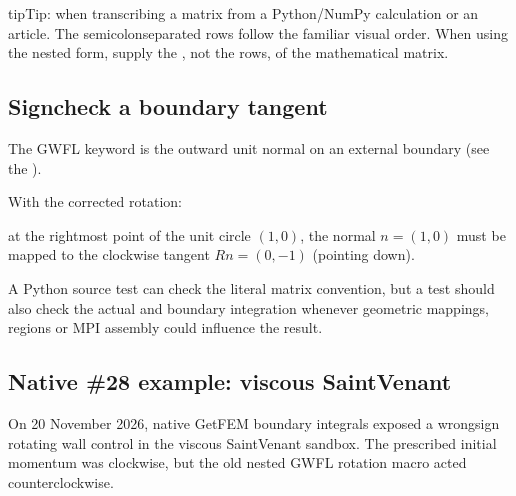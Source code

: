 \documentclass[letterpaper,10pt,english]{sphinxmanual}
\begin{document}
\begin{sphinxadmonition}{tip}{Tip:}
\sphinxAtStartPar
{} \sphinxcode{\sphinxupquote{{[}a,b;c,d{]}}} when transcribing
a matrix from a Python/NumPy calculation or an article.
The semicolon\sphinxhyphen{}separated rows follow the familiar visual order.
When using the nested form, supply the , not the rows,
of the mathematical matrix.
\end{sphinxadmonition}


\subsection{Sign\sphinxhyphen{}check a boundary tangent}
\label{\detokenize{getfem_gwfl:sign-check-a-boundary-tangent}}
\sphinxAtStartPar
The GWFL keyword  is the outward unit normal
on an external boundary (see the ).

\sphinxAtStartPar
With the corrected rotation:

\begin{sphinxVerbatim}[commandchars=\\\{\}]
 
 
\end{sphinxVerbatim}

\sphinxAtStartPar
at the rightmost point of the unit circle \((1,0)\),
the normal \(n=(1,0)\) must be mapped to the
clockwise tangent \(Rn=(0,-1)\) (pointing down).

\sphinxAtStartPar
A Python source test can check the literal matrix convention,
but a  test should also check the actual
 and boundary integration whenever geometric mappings,
regions or MPI assembly could influence the result.


\subsection{Native \#28 example: viscous Saint\sphinxhyphen{}Venant}
\label{\detokenize{getfem_gwfl:native-28-example-viscous-saint-venant}}
\sphinxAtStartPar
On 20 November 2026, native GetFEM boundary integrals exposed
a wrong\sphinxhyphen{}sign rotating wall control in the viscous Saint\sphinxhyphen{}Venant
sandbox. The prescribed initial momentum was clockwise, but the
old nested GWFL rotation macro acted counterclockwise.
\end{document}
